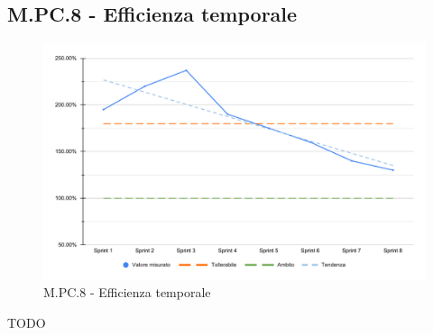 \subsection{M.PC.8 - Efficienza temporale}
\begin{figure}[H]
    \centering
    \includegraphics[width=\textwidth]{assets/efficienza_temporale.pdf}
    \caption{M.PC.8 - Efficienza temporale}
\end{figure}

\par TODO